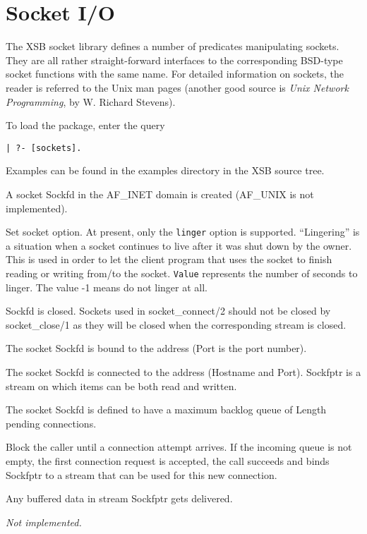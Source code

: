 \section{Socket I/O}

The XSB socket library defines a number of predicates manipulating
sockets. They are all rather straight-forward interfaces to the
corresponding BSD-type socket functions with the same name. For detailed
information on sockets, the reader is referred to the Unix man pages
(another good source is \emph{Unix Network Programming}, by W. Richard
Stevens).

To load the package, enter the query 
\begin{verbatim}
| ?- [sockets].
\end{verbatim}

Examples can be found in the examples directory in the XSB source tree.

\begin{description}
    A socket Sockfd in the AF\_INET domain is created (AF\_UNIX is not
implemented). 

    Set socket option. At present, only the {\tt linger} option is
    supported. ``Lingering'' is a situation when a socket continues to live
    after it was shut down by the owner. This is used in order to let the
    client program that uses the socket to finish reading or writing
    from/to the socket. {\tt Value} represents the number of seconds to linger.
    The value -1 means do not linger at all.

    Sockfd is closed. Sockets used in socket\_connect/2 should not be
closed by socket\_close/1 as they will be closed when the corresponding
stream is closed.

   The socket Sockfd is bound to the address (Port is the port number).

    The socket Sockfd is connected to the address (Hostname and
Port). Sockfptr is a stream on which items can be both read and written.

    The socket Sockfd is defined to have a maximum backlog queue of
Length pending connections.

    Block the caller until a connection attempt arrives. If the incoming 
    queue is not empty, the first connection request is accepted, the call
    succeeds and binds Sockfptr to a stream that can be used for this new
    connection.

    Any buffered data in stream Sockfptr gets delivered.

  \emph{Not implemented.}

\end{description}

